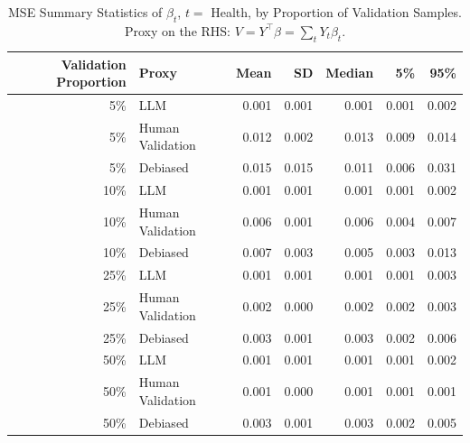 \begin{table}

\caption{\label{tab:unnamed-chunk-1}MSE Summary Statistics of $\beta_{t}$, $t=$ Health, by Proportion of Validation Samples.
      Proxy on the RHS: $V = Y^\top \beta = \sum_{t} Y_t \beta_t$.}
\centering
\begin{tabular}[t]{rlrrrrr}
\toprule
Validation Proportion & Proxy & Mean & SD & Median & 5\% & 95\%\\
\midrule
5\% & LLM & 0.001 & 0.001 & 0.001 & 0.001 & 0.002\\
5\% & Human Validation & 0.012 & 0.002 & 0.013 & 0.009 & 0.014\\
5\% & Debiased & 0.015 & 0.015 & 0.011 & 0.006 & 0.031\\
10\% & LLM & 0.001 & 0.001 & 0.001 & 0.001 & 0.002\\
10\% & Human Validation & 0.006 & 0.001 & 0.006 & 0.004 & 0.007\\
10\% & Debiased & 0.007 & 0.003 & 0.005 & 0.003 & 0.013\\
25\% & LLM & 0.001 & 0.001 & 0.001 & 0.001 & 0.003\\
25\% & Human Validation & 0.002 & 0.000 & 0.002 & 0.002 & 0.003\\
25\% & Debiased & 0.003 & 0.001 & 0.003 & 0.002 & 0.006\\
50\% & LLM & 0.001 & 0.001 & 0.001 & 0.001 & 0.002\\
50\% & Human Validation & 0.001 & 0.000 & 0.001 & 0.001 & 0.001\\
50\% & Debiased & 0.003 & 0.001 & 0.003 & 0.002 & 0.005\\
\bottomrule
\end{tabular}
\end{table}
